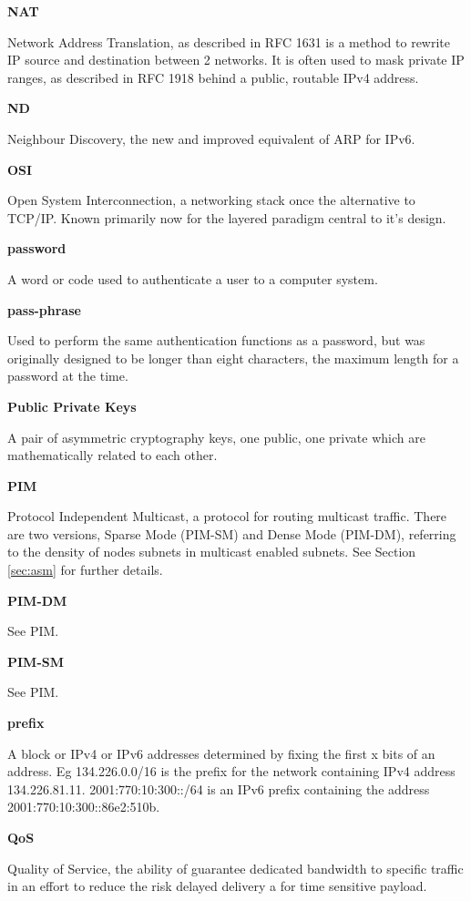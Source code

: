 \textbf{NAT}

Network Address Translation, as described in RFC 1631 is a method
to rewrite IP source and destination between 2 networks. It is often
used to mask private IP ranges, as described in RFC 1918 behind a 
public, routable IPv4 address. 

\textbf{ND}

Neighbour Discovery, the new and improved equivalent of ARP for IPv6.

\textbf{OSI}

Open System Interconnection, a networking stack once the alternative to
TCP/IP. Known primarily now for the layered paradigm central to it's
design.

\textbf{password}

A word or code used to authenticate a user to a computer system.

\textbf{pass-phrase}

Used to perform the same authentication functions as a password, but was
originally designed to be longer than eight characters, the maximum
length for a password at the time.

\textbf{Public Private Keys}

A pair of asymmetric cryptography keys, one public, one private which 
are mathematically related to each other. 

\textbf{PIM}

Protocol Independent Multicast, a protocol for routing multicast
traffic. There are two versions, Sparse Mode (PIM-SM) and Dense Mode
(PIM-DM), referring to the density of nodes subnets in multicast 
enabled subnets. See Section \ref{sec:asm} for further details.

\textbf{PIM-DM}

See PIM.

\textbf{PIM-SM}

See PIM.

\textbf{prefix}

A block or IPv4 or IPv6 addresses determined by fixing the first x bits
of an address. Eg 134.226.0.0/16 is the prefix for the network
containing IPv4 address 134.226.81.11. 2001:770:10:300::/64 is an IPv6
prefix containing the address 2001:770:10:300::86e2:510b. 

\textbf{QoS}

Quality of Service, the ability of guarantee dedicated bandwidth to
specific traffic in an effort to reduce the risk delayed delivery a for
time sensitive payload.


